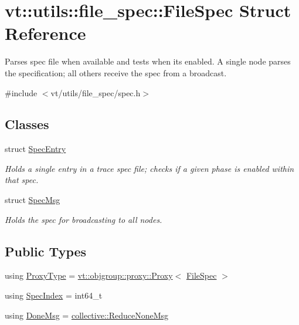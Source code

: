\hypertarget{structvt_1_1utils_1_1file__spec_1_1_file_spec}{}\section{vt\+:\+:utils\+:\+:file\+\_\+spec\+:\+:File\+Spec Struct Reference}
\label{structvt_1_1utils_1_1file__spec_1_1_file_spec}


Parses spec file when available and tests when its enabled. A single node parses the specification; all others receive the spec from a broadcast.  




{\ttfamily \#include $<$vt/utils/file\+\_\+spec/spec.\+h$>$}

\subsection*{Classes}
\begin{DoxyCompactItemize}
\item 
struct \hyperlink{structvt_1_1utils_1_1file__spec_1_1_file_spec_1_1_spec_entry}{Spec\+Entry}
\begin{DoxyCompactList}\small\item\em Holds a single entry in a trace spec file; checks if a given phase is enabled within that spec. \end{DoxyCompactList}\item 
struct \hyperlink{structvt_1_1utils_1_1file__spec_1_1_file_spec_1_1_spec_msg}{Spec\+Msg}
\begin{DoxyCompactList}\small\item\em Holds the spec for broadcasting to all nodes. \end{DoxyCompactList}\end{DoxyCompactItemize}
\subsection*{Public Types}
\begin{DoxyCompactItemize}
\item 
using \hyperlink{structvt_1_1utils_1_1file__spec_1_1_file_spec_ac4ad61ed146069ab671ec1bf909ebded}{Proxy\+Type} = \hyperlink{structvt_1_1objgroup_1_1proxy_1_1_proxy}{vt\+::objgroup\+::proxy\+::\+Proxy}$<$ \hyperlink{structvt_1_1utils_1_1file__spec_1_1_file_spec}{File\+Spec} $>$
\item 
using \hyperlink{structvt_1_1utils_1_1file__spec_1_1_file_spec_a3817fca09dbe932e0f6ba5729f1965ba}{Spec\+Index} = int64\+\_\+t
\item 
using \hyperlink{structvt_1_1utils_1_1file__spec_1_1_file_spec_ac8062352203598c411265a478ec1b0c7}{Done\+Msg} = \hyperlink{namespacevt_1_1collective_aa439a90f05078f2bcf918641c951946f}{collective\+::\+Reduce\+None\+Msg}
\end{DoxyCompactItemize}
